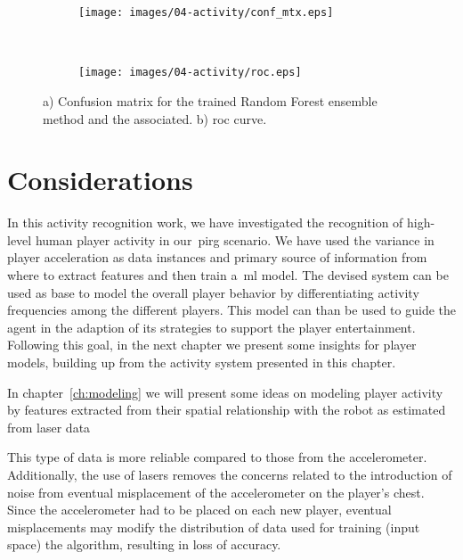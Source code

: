 \begin{figure}[h]
    \centering
    \begin{subfigure}[h]{7cm}
       \centering
       \texttt{[image: images/04-activity/conf\_mtx.eps]}
       \caption{}
	\end{subfigure}
	~
    \begin{subfigure}[h]{7cm}
     	\centering
        \texttt{[image: images/04-activity/roc.eps]}
        \caption{}
	\end{subfigure}
	\caption{a) Confusion matrix for the trained Random Forest ensemble method and the associated. b) \gls{roc} curve.}\label{fig:mtx-roc}
\end{figure}

\section{Considerations}

In this activity recognition work, we have investigated the recognition of high-level human player activity in our~\gls{pirg} scenario. We have used the variance in player acceleration as data instances and primary source of information from where to extract features and then train a~\gls{ml} model. The devised system can be used as base to model the overall player behavior by differentiating activity frequencies among the different players. This model can than be used to guide the agent in the adaption of its strategies to support the player entertainment. Following this goal, in the next chapter we present some insights for player models, building up from the activity system presented in this chapter.

In chapter~\ref{ch:modeling} we will present some ideas on modeling player activity by features extracted from their spatial relationship with the robot as estimated from laser data

This type of data is more reliable compared to those from the accelerometer. Additionally, the use of lasers removes the concerns related to the introduction of noise from eventual misplacement of the accelerometer on the player's chest. Since the accelerometer had to be placed on each new player, eventual misplacements may modify the distribution of data used for training (input space) the algorithm, resulting in loss of accuracy. 
